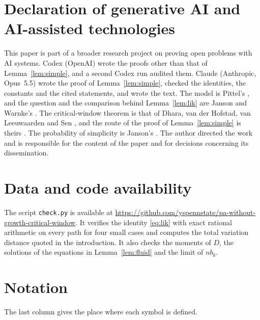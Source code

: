 \documentclass[11pt]{amsart}
\theoremstyle{remark}
\numberwithin{equation}{section}
\begin{document}
\section*{Declaration of generative AI and AI-assisted technologies}

This paper is part of a broader research project on proving open problems with AI systems. Codex (OpenAI) wrote the proofs other than that of Lemma~\ref{lem:simple}, and a second Codex run audited them. Claude (Anthropic, Opus~5.5) wrote the proof of Lemma~\ref{lem:simple}, checked the identities, the constants and the cited statements, and wrote the text. The model is Pittel's \cite{Pi10}, and the question and the comparison behind Lemma~\ref{lem:lik} are Janson and Warnke's \cite{JW21}. The critical-window theorem is that of Dhara, van der Hofstad, van Leeuwaarden and Sen \cite{DHLS17}, and the route of the proof of Lemma~\ref{lem:simple} is theirs \cite[Section~7]{DHLS20}. The probability of simplicity is Janson's \cite{Ja09}. The author directed the work and is responsible for the content of the paper and for decisions concerning its dissemination.

\section*{Data and code availability}

The script \texttt{check.py} is available at \url{https://github.com/yspennstate/pa-without-growth-critical-window}. It verifies the identity \eqref{eq:lik} with exact rational arithmetic on every path for four small cases and computes the total variation distance quoted in the introduction. It also checks the moments of $D$, the solutions of the equations in Lemma~\ref{lem:fluid} and the limit of $nb_k$.

\appendix
\section{Notation}\label{app:notation}
The last column gives the place where each symbol is defined.
\end{document}
